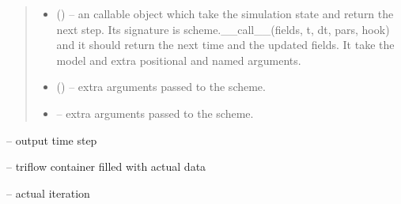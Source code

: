 \documentclass[letterpaper,10pt,english]{sphinxmanual}
\begin{document}
\begin{fulllineitems}
\begin{quote}
\begin{description}
\begin{itemize}
\item {} 
 (\sphinxstyleliteralemphasis{, }\sphinxstyleliteralemphasis{, }) -- an callable object which take the simulation state and return the next step. Its signature is scheme.\_\_call\_\_(fields, t, dt, pars, hook) and it should return the next time and the updated fields. It take the model and extra positional and named arguments.

\item {} 
 (\sphinxstyleliteralemphasis{,}\sphinxstyleliteralemphasis{}) -- 
extra arguments passed to the scheme.


\item {} 
 -- 
extra arguments passed to the scheme.


\end{itemize}

\end{description}\end{quote}

\begin{fulllineitems}
\label{\detokenize{triflow.core:triflow.core.simulation.Simulation.dt}}
 -- output time step

\end{fulllineitems}


\begin{fulllineitems}
\label{\detokenize{triflow.core:triflow.core.simulation.Simulation.fields}}
 -- triflow container filled with actual data

\end{fulllineitems}


\begin{fulllineitems}
\label{\detokenize{triflow.core:triflow.core.simulation.Simulation.i}}
 -- actual iteration

\end{fulllineitems}


\end{fulllineitems}
\end{document}
